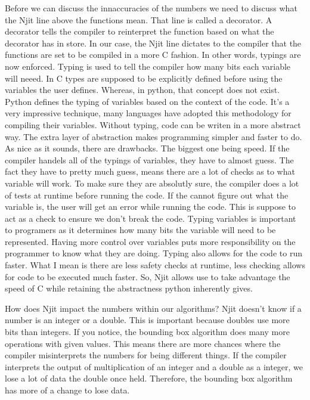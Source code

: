 \documentclass{article}
\begin{document}
Before we can discuss the innaccuracies of the numbers we need to discuss what the Njit line above the functions mean.
That line is called a decorator.
A decorator tells the compiler to reinterpret the function based on what the decorator has in store.
In our case, the Njit line dictates to the compiler that the functions are set to be compiled in a more C fashion.
In other words, typings are now enforced.
Typing is used to tell the compiler how many bits each variable will neeed.
In C types are supposed to be explicitly defined before using the variables the user defines.
Whereas, in python, that concept does not exist.
Python defines the typing of variables based on the context of the code.
It's a very impressive technique, many languages have adopted this methodology for compiling their variables.
Without typing, code can be writen in a more abstract way.
The extra layer of abstraction makes programming simpler and faster to do.
As nice as it sounds, there are drawbacks.
The biggest one being speed.
If the compiler handels all of the typings of variables, they have to almost guess.
The fact they have to pretty much guess, means there are a lot of checks as to what variable will work.
To make sure they are absolutly sure, the compiler does a lot of tests at runtime before running the code.
If the cannot figure out what the variable is, the user will get an error while running the code.
This is suppose to act as a check to ensure we don't break the code.
Typing variables is important to programers as it determines how many bits the variable will need to be represented.
Having more control over variables puts more responsibility on the programmer to know what they are doing.
Typing also allows for the code to run faster.
What I mean is there are less safety checks at runtime, less checking allows for code to be executed much faster.
So, Njit allows use to take advantage the speed of C while retaining the abstractness python inherently gives.

How does Njit impact the numbers within our algorithms?
Njit doesn't know if a number is an integer or a double.
This is important because doubles use more bits than integers.
If you notice, the bounding box algorithm does many more operations with given values.
This means there are more chances where the compiler misinterprets the numbers for being different things.
If the compiler interprets the output of multiplication of an integer and a double as a integer, we lose a lot of data the double once held.
Therefore, the bounding box algorithm has more of a change to lose data.





{}

\end{document}
